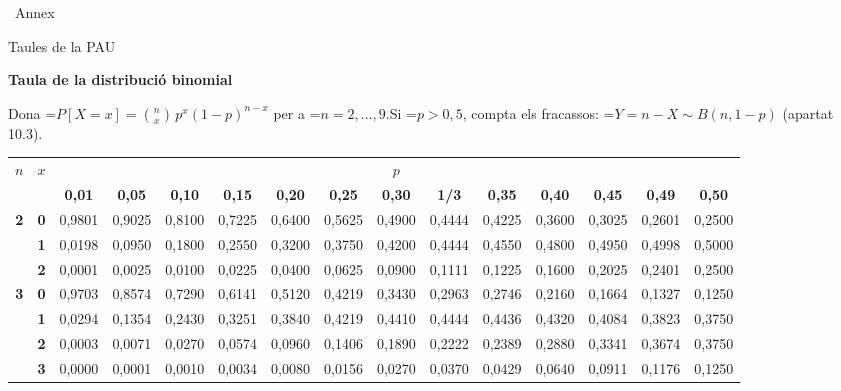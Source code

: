 \documentclass[11pt,a4paper]{article}
\newcommand{\fmm}[1]{\setbox0=\hbox{$#1$}\ifdim\wd0>\linewidth\[#1\]\else\mbox{\box0}\fi}
\begin{document}
  
\clearpage
\hypertarget{annex}{}
{\color{fmnavy}\Large\bfseries\colorbox{fmdef}{\color{white}\strut\ Annex\ }\hspace{0.6em}Taules de la PAU\par}\vspace{2pt}{\color{fmdef}\titlerule[1.2pt]}
\vspace{6pt}
\label{tbin}{\color{fmgreen}\large\bfseries Taula de la distribució binomial}\par\smallskip
Dona \fmm{P[X=x]=\binom nx\,p^x(1-p)^{n-x}} per a \fmm{n=2,\dots,9}.\newline Si \fmm{p\gt0{,}5}, compta els fracassos: \fmm{Y=n-X\sim B(n,1-p)} (apartat 10.3).\par\smallskip
\begin{center}\linespread{1}\selectfont\scriptsize\setlength{\tabcolsep}{4.2pt}\renewcommand{\arraystretch}{1.0}
\begin{tabular}{cc|ccccccccccccc}\toprule
\multirow{2}{*}{$n$} & \multirow{2}{*}{$x$} & \multicolumn{13}{c}{$p$}\\
 & & \textbf{0,01} & \textbf{0,05} & \textbf{0,10} & \textbf{0,15} & \textbf{0,20} & \textbf{0,25} & \textbf{0,30} & \textbf{1/3} & \textbf{0,35} & \textbf{0,40} & \textbf{0,45} & \textbf{0,49} & \textbf{0,50}\\
\midrule
\multirow{3}{*}{\textbf{2}} & \textbf{0} & 0,9801 & 0,9025 & 0,8100 & 0,7225 & 0,6400 & 0,5625 & 0,4900 & 0,4444 & 0,4225 & 0,3600 & 0,3025 & 0,2601 & 0,2500\\
 & \textbf{1} & 0,0198 & 0,0950 & 0,1800 & 0,2550 & 0,3200 & 0,3750 & 0,4200 & 0,4444 & 0,4550 & 0,4800 & 0,4950 & 0,4998 & 0,5000\\
 & \textbf{2} & 0,0001 & 0,0025 & 0,0100 & 0,0225 & 0,0400 & 0,0625 & 0,0900 & 0,1111 & 0,1225 & 0,1600 & 0,2025 & 0,2401 & 0,2500\\
\midrule
\multirow{4}{*}{\textbf{3}} & \textbf{0} & 0,9703 & 0,8574 & 0,7290 & 0,6141 & 0,5120 & 0,4219 & 0,3430 & 0,2963 & 0,2746 & 0,2160 & 0,1664 & 0,1327 & 0,1250\\
 & \textbf{1} & 0,0294 & 0,1354 & 0,2430 & 0,3251 & 0,3840 & 0,4219 & 0,4410 & 0,4444 & 0,4436 & 0,4320 & 0,4084 & 0,3823 & 0,3750\\
 & \textbf{2} & 0,0003 & 0,0071 & 0,0270 & 0,0574 & 0,0960 & 0,1406 & 0,1890 & 0,2222 & 0,2389 & 0,2880 & 0,3341 & 0,3674 & 0,3750\\
 & \textbf{3} & 0,0000 & 0,0001 & 0,0010 & 0,0034 & 0,0080 & 0,0156 & 0,0270 & 0,0370 & 0,0429 & 0,0640 & 0,0911 & 0,1176 & 0,1250\\

\end{tabular}
\end{center}
\end{document}
